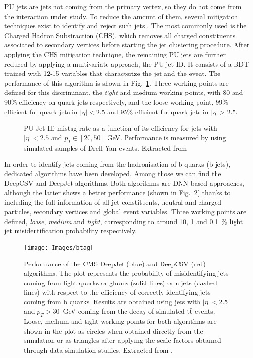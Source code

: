 \documentclass[../main.tex]{subfiles}
\begin{document}
PU jets are jets not coming from the primary vertex, so they do not come from the interaction under study. To reduce the amount of them, several mitigation techniques exist to identify and reject such jets \cite{intro:id:pujet}. The most commonly used is the Charged Hadron Substraction (CHS), which removes all charged constituents associated to secondary vertices before starting the jet clustering procedure. After applying the CHS mitigation technique, the remaining PU jets are further reduced by applying a multivariate approach, the PU jet ID. It consists of a BDT trained with 12-15 variables that characterize the jet and the event. The performance of this algorithm is shown in Fig.~\ref{intro:fig:pujetid}.  Three working points are defined for this discriminant, the \textit{tight} and medium working points, with 80 and 90\% efficiency on quark jets respectively, and the loose working point, 99\% efficient for quark jets in $|\eta|<2.5$ and 95\% efficient for quark jets in $|\eta|>2.5$.


\begin{figure}[h!]
\begin{center}
\end{center}
\caption{PU Jet ID mistag rate as a function of its efficiency for jets with $|\eta|<2.5$ and $p_T\in[20, 50]$ GeV. Performance is measured by using simulated samples of Drell-Yan events. Extracted from \cite{intro:id:pujetid}}
\label{intro:fig:pujetid}
\end{figure}


In order to identify jets coming from the hadronisation of b quarks (b-jets), dedicated algorithms have been developed. Among those we can find the DeepCSV \cite{intro:id:deepcsv} and DeepJet \cite{intro:id:deepflavour} algorithms. Both algorithms are DNN-based approaches, although the latter shows a better performance (shown in Fig.~\ref{intro:fig:btag}) thanks to including the full information of all jet constituents, neutral and charged particles, secondary vertices and global event variables. Three working points are defined, \textit{loose}, \textit{medium} and \textit{tight}, corresponding to around 10, 1 and 0.1~\% light jet misidentification probability respectively.

\begin{figure}[h!]
\begin{center}
\texttt{[image: Images/btag]}
\end{center}
\caption{Performance of the CMS DeepJet (blue) and DeepCSV (red) algorithms.  
The plot represents the probability of misidentifying jets coming from light quarks or gluons (solid lines) or c jets (dashed lines) with respect to the efficiency of correctly identifying jets coming from b quarks. Results are obtained using jets with $|\eta|<2.5$ and $p_T>30$~GeV coming from the decay of simulated $\text{t}\bar{\text{t}}$ events. Loose, medium and tight working points for both algorithms are shown in the plot as circles when obtained directly from the simulation or as triangles after applying the scale factors obtained through data-simulation studies. Extracted from \cite{intro:id:deep_csv_jet}.}
\label{intro:fig:btag}
\end{figure}
\end{document}
